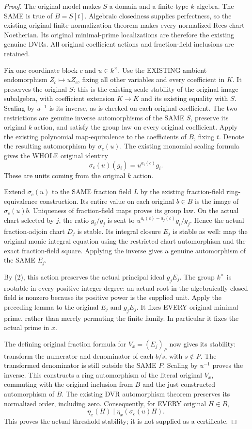 \begin{proof}
The original model makes $S$ a domain and a finite-type $k$-algebra.
The SAME is true of $B=S[t]$. Algebraic closedness supplies perfectness,
so the existing original finite-normalization theorem makes every
normalized Rees chart Noetherian. Its original minimal-prime
localizations are therefore the existing genuine DVRs. All original
coefficient actions and fraction-field inclusions are retained.

Fix one coordinate block $c$ and $u\in k^\times$. Use the EXISTING
ambient endomorphism $Z_c\mapsto uZ_c$, fixing all other variables
and every coefficient in $K$. It preserves the original $S$:
this is the existing scale-stability of the original image subalgebra,
with coefficient extension $K\to K$ and its existing equality with
$S$. Scaling by $u^{-1}$ is its inverse, as is checked on each original
coefficient. The two restrictions are genuine inverse automorphisms of
the SAME $S$, preserve its original $k$ action, and satisfy the group
law on every original coefficient. Apply the existing polynomial
map-equivalence to the coefficients of $B$, fixing $t$. Denote the
resulting automorphism by $\sigma_c(u)$. The existing monomial scaling
formula gives the WHOLE original identity
\[
 \sigma_c(u)(g_i)=u^{a_i(c)}g_i.
 \tag{2}
\]
These are units coming from the original $k$ action.

Extend $\sigma_c(u)$ to the SAME fraction field $L$ by the existing
fraction-field ring-equivalence construction. Its entire value on
each original $b\in B$ is the image of $\sigma_c(u)b$. Uniqueness of
fraction-field maps proves its group law. On the actual chart selected
by $j$, the ratio $g_i/g_j$ is sent to
$u^{a_i(c)-a_j(c)}g_i/g_j$. Hence the actual fraction-adjoin chart
$D_j$ is stable. Its integral closure $E_j$ is stable as well: map the
original monic integral equation using the restricted chart
automorphism and the exact fraction-field square. Applying the inverse
gives a genuine automorphism of the SAME $E_j$.

By (2), this action preserves the actual principal ideal $g_jE_j$.
The group $k^\times$ is rootable in every positive integer degree:
an actual root in the algebraically closed field is nonzero because
its positive power is the supplied unit. Apply the preceding lemma
to the original $E_j$ and $g_jE_j$. It fixes EVERY original minimal
prime, rather than merely permuting the finite family. In particular
it fixes the actual prime in $x$.

The defining original fraction formula for $V_x=(E_j)_P$ now gives
its stability: transform the numerator and denominator of each
$b/s$, with $s\notin P$. The transformed denominator is still outside
the SAME $P$. Scaling by $u^{-1}$ proves the inverse. This constructs
a ring automorphism of the literal original $V_x$, commuting with the
original inclusion from $B$ and the just constructed automorphism of
$B$. The existing DVR automorphism theorem preserves its normalized
order, including zero. Consequently, for EVERY original $H\in B$,
\[
 \eta_x(H)\mid\eta_x(\sigma_c(u)H).
 \tag{3}
\]
This proves the actual threshold stability; it is not supplied as a
certificate.


\end{proof}
